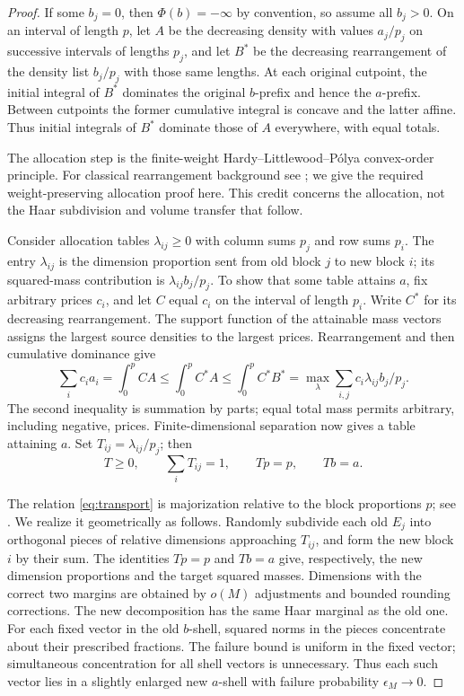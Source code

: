 \documentclass[11pt]{article}
\numberwithin{equation}{section}
\theoremstyle{definition}
\begin{document}
\begin{proof}
If some $b_j=0$, then $\Phi(b)=-\infty$ by convention, so assume all $b_j>0$. On an interval of length $p$, let $A$ be the decreasing density with values $a_j/p_j$ on successive intervals of lengths $p_j$, and let $B^*$ be the decreasing rearrangement of the density list $b_j/p_j$ with those same lengths. At each original cutpoint, the initial integral of $B^*$ dominates the original $b$-prefix and hence the $a$-prefix. Between cutpoints the former cumulative integral is concave and the latter affine. Thus initial integrals of $B^*$ dominate those of $A$ everywhere, with equal totals.

The allocation step is the finite-weight Hardy--Littlewood--P\'olya
convex-order principle.  For classical rearrangement background see
\cite[Chapter~X]{HardyLittlewoodPolya1952}; we give the required
weight-preserving allocation proof here.  This credit concerns the
allocation, not the Haar subdivision and volume transfer that follow.

Consider allocation tables $\lambda_{ij}\ge0$ with column sums $p_j$ and row sums $p_i$. The entry $\lambda_{ij}$ is the dimension proportion sent from old block $j$ to new block $i$; its squared-mass contribution is $\lambda_{ij}b_j/p_j$. To show that some table attains $a$, fix arbitrary prices $c_i$, and let $C$ equal $c_i$ on the interval of length $p_i$. Write $C^*$ for its decreasing rearrangement. The support function of the attainable mass vectors assigns the largest source densities to the largest prices. Rearrangement and then cumulative dominance give
\[
\sum_i c_i a_i=\int_0^p CA
\le\int_0^p C^*A
\le\int_0^p C^*B^*
=\max_{\lambda}\sum_{i,j}c_i\lambda_{ij}b_j/p_j.
\]
The second inequality is summation by parts; equal total mass permits arbitrary, including negative, prices. Finite-dimensional separation now gives a table attaining $a$. Set $T_{ij}=\lambda_{ij}/p_j$; then
\begin{equation}\label{eq:transport}
T\ge0,\qquad \sum_iT_{ij}=1,\qquad Tp=p,\qquad Tb=a.
\end{equation}

The relation \eqref{eq:transport} is majorization relative to the block proportions $p$; see \cite[Definition~1 and Proposition~1]{vomEndeDirr2022}. We realize it geometrically as follows. Randomly subdivide each old $E_j$ into orthogonal pieces of relative dimensions approaching $T_{ij}$, and form the new block $i$ by their sum. The identities $Tp=p$ and $Tb=a$ give, respectively, the new dimension proportions and the target squared masses. Dimensions with the correct two margins are obtained by $o(M)$ adjustments and bounded rounding corrections. The new decomposition has the same Haar marginal as the old one. For each fixed vector in the old $b$-shell, squared norms in the pieces concentrate about their prescribed fractions. The failure bound is uniform in the fixed vector; simultaneous concentration for all shell vectors is unnecessary. Thus each such vector lies in a slightly enlarged new $a$-shell with failure probability $\epsilon_M\to0$.


\end{proof}
\end{document}
